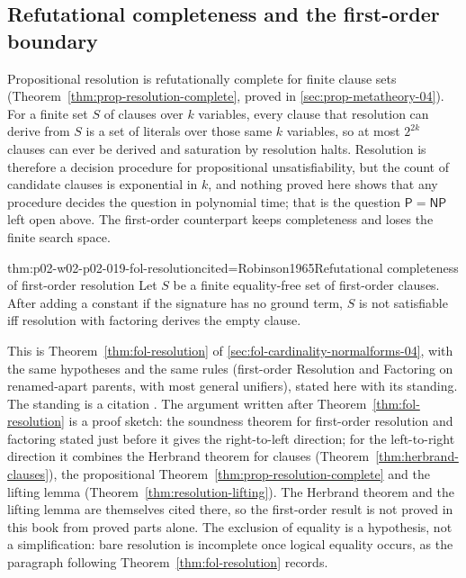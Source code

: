 \subsection{Refutational completeness and the first-order boundary}
\label{sec:p02-w02-p02-019-first-order-boundary}

Propositional resolution is refutationally complete for finite clause sets
(Theorem~\ref{thm:prop-resolution-complete}, proved in
\cref{sec:prop-metatheory-04}).  For a finite set \(S\) of clauses over
\(k\) variables, every clause that resolution can derive from \(S\) is a set
of literals over those same \(k\) variables, so at most \(2^{2k}\) clauses can
ever be derived and saturation by resolution halts.  Resolution is therefore a
decision procedure for propositional unsatisfiability, but the count of
candidate clauses is exponential in \(k\), and nothing proved here shows that
any procedure decides the question in polynomial time; that is the question
\(\mathsf P=\mathsf{NP}\) left open above.  The first-order counterpart keeps
completeness and loses the finite search space.

\begin{hbtheorem}{thm:p02-w02-p02-019-fol-resolution}{cited=Robinson1965}{Refutational completeness of first-order resolution}
Let \(S\) be a finite equality-free set of first-order clauses.  After adding
a constant if the signature has no ground term, \(S\) is not satisfiable iff
resolution with factoring derives the empty clause.
\end{hbtheorem}

This is Theorem~\ref{thm:fol-resolution} of
\cref{sec:fol-cardinality-normalforms-04}, with the same hypotheses and the
same rules (first-order Resolution and Factoring on renamed-apart parents,
with most general unifiers), stated here with its standing.  The standing is
a citation \cite{Robinson1965,BachmairGanzinger2001}.  The argument written
after Theorem~\ref{thm:fol-resolution} is a proof sketch: the soundness
theorem for first-order resolution and factoring stated just before it gives
the right-to-left direction; for the left-to-right direction it combines the
Herbrand theorem for clauses (Theorem~\ref{thm:herbrand-clauses}), the
propositional Theorem~\ref{thm:prop-resolution-complete} and the lifting
lemma (Theorem~\ref{thm:resolution-lifting}).  The Herbrand theorem and the
lifting lemma are themselves cited there, so the first-order result is not
proved in this book from proved parts alone.  The exclusion of equality is a
hypothesis, not a simplification: bare resolution is incomplete once logical
equality occurs, as the paragraph following Theorem~\ref{thm:fol-resolution}
records.


